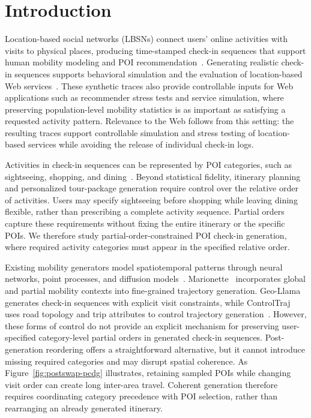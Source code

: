 \section{Introduction}
\label{sec:intro}

Location-based social networks (LBSNs) connect users' online activities with
visits to physical places, producing time-stamped check-in sequences that
support human mobility modeling and POI recommendation~\cite{feng2018deepmove,luo2021stan,yang2022getnext}.
Generating realistic check-in sequences supports behavioral simulation and the
evaluation of location-based Web services~\cite{feng2020simulate,yuan2022activity,long2023synthetic,deng2025marionette}.
These synthetic traces also provide controllable inputs for Web applications
such as recommender stress tests and service simulation, where preserving
population-level mobility statistics is as important as satisfying a requested
activity pattern.
Relevance to the Web follows from this setting: the resulting traces support
controllable simulation and stress testing of location-based services while
avoiding the release of individual check-in logs.

Activities in check-in sequences can be represented by POI categories, such as
sightseeing, shopping, and dining~\cite{long2023synthetic,yuan2023stdpp,deng2025marionette}.
Beyond statistical fidelity, itinerary planning and personalized tour-package
generation require control over the relative order of activities. Users may
specify sightseeing before shopping while leaving dining flexible, rather than
prescribing a complete activity sequence. Partial orders capture these
requirements without fixing the entire itinerary or the specific POIs. We
therefore study partial-order-constrained POI check-in generation, where
required activity categories must appear in the specified relative order.

Existing mobility generators model spatiotemporal patterns through neural
networks, point processes, and diffusion models~\cite{li2025geollama,deng2025marionette}.
Marionette~\cite{deng2025marionette} incorporates global and partial mobility
contexts into fine-grained trajectory generation. Geo-Llama~\cite{li2025geollama}
generates check-in sequences with explicit visit constraints, while ControlTraj
uses road topology and trip attributes to control trajectory generation~\cite{zhu2024controltraj}.
However, these forms of control do not provide an explicit mechanism for
preserving user-specified category-level partial orders in generated check-in
sequences. Post-generation reordering offers a straightforward alternative,
but it cannot introduce missing required categories and may disrupt spatial
coherence. As Figure~\ref{fig:postswap-pcdg} illustrates, retaining sampled
POIs while changing visit order can create long inter-area travel. Coherent
generation therefore requires coordinating category precedence with POI
selection, rather than rearranging an already generated itinerary.

